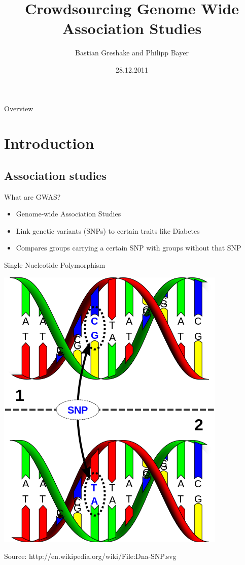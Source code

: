 \documentclass[12pt,a4paper]{beamer}
\title[Open-GWAS]{Crowdsourcing Genome Wide Association Studies}%
\date{28.12.2011}
\author{Bastian Greshake and Philipp Bayer}
\begin{document}
\begin{frame}
\titlepage
\end{frame}

\begin{frame}{Overview}
\tableofcontents
\end{frame}

\section{Introduction}
\subsection{Association studies}

\begin{frame}{What are GWAS?}
\begin{itemize}
\item Genome-wide Association Studies
\pause \item Link genetic variants (SNPs) to certain traits like Diabetes
\pause \item Compares groups carrying a certain SNP with groups without that SNP
\end{itemize}
\end{frame}

\begin{frame}{Single Nucleotide Polymorphism}
\begin{center}
\includegraphics[scale=0.4]{SNP.png} \\
\begin{tiny}Source: http://en.wikipedia.org/wiki/File:Dna-SNP.svg\end{tiny}
\end{center}
\end{frame}
\end{document}
